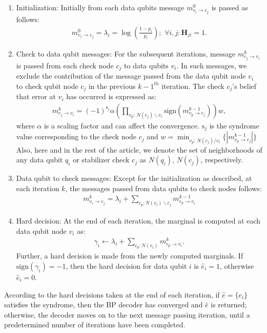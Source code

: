 \documentclass[%
 reprint,
 amsmath,amssymb,
 aps,
pra,
showkeys,
]{revtex4-2}
\begin{document}
\begin{enumerate}
    \item Initialization: Initially from each data qubits message $m^0_{v_i\rightarrow c_j}$ is passed as follows:
    \begin{align}
        m^0_{v_i\rightarrow c_j} = \lambda_i = \log(\frac{1-p_i}{p_i});\,\, \forall i,j : \mathbf{H}_{ji} = 1.
    \end{align}
    \item Check to data qubit messages: For the subsequent iterations, message $m^{k}_{c_j \rightarrow v_i}$ is passed from each check node $c_j$ to data qubits $v_i$.
    In such messages, we exclude the contribution of the message passed from the data qubit node $v_i$ to check qubit node $c_j$ in the previous ${k-1}^{th}$ iteration.
    The check $c_j$'s belief that error at $v_i$ has occurred is expressed as:
    \begin{align}
        m^{k}_{c_j \rightarrow v_i} = (-1)^{\mathrm{s}_j}\alpha \left(\prod_{v_p:\,N(c_j)\backslash v_i} \mathrm{sign}(m^{k-1}_{v_p\rightarrow c_j})\right) w,
    \end{align}
    where $\alpha$ is a scaling factor and can affect the convergence.
    $\mathrm{s}_j$ is the syndrome value corresponding to the check node $c_j$ and $w = \min_{v_p:\,N(c_j)/v_i}\{|m^{k-1}_{v_p\rightarrow c_j}|\}$
    Also, here and in the rest of the article, we denote the set of neighborhoods of any data qubit $q_i$ or stabilizer check $c_j$ as $N(q_i)$, $N(c_j)$, respectively.
    \item Data qubit to check messages: Except for the initialization as described, at each iteration $k$, the messages passed from data qubits to check nodes follows:
    \begin{align}
        m^k_{v_i\rightarrow c_j} = \lambda_i + \sum_{c_p: N(v_i)\backslash c_j}m^{k-1}_{c_p\rightarrow v_i}
    \end{align}
    \item Hard decision: At the end of each iteration, the marginal is computed at each data qubit node $v_i$ as:
    \begin{align}
        \gamma_i \gets \lambda_i + \sum_{c_p: N(v_i)}m^{k}_{c_p\rightarrow v_i}.
    \end{align}
    Further, a hard decision is made from the newly computed marginals.
    If $\mathrm{sign}(\gamma_i) = -1$, then the hard decision for data qubit $i$ is $\hat{e}_i = 1$, otherwise $\hat{e}_i = 0$.
\end{enumerate}
According to the hard decisions taken at the end of each iteration, if $\hat{e} = \{e_i\}$ satisfies the syndrome, then the BP decoder has converged and $\hat{e}$ is returned; otherwise, the decoder moves on to the next message passing iteration, until a predetermined number of iterations have been completed.
\end{document}
